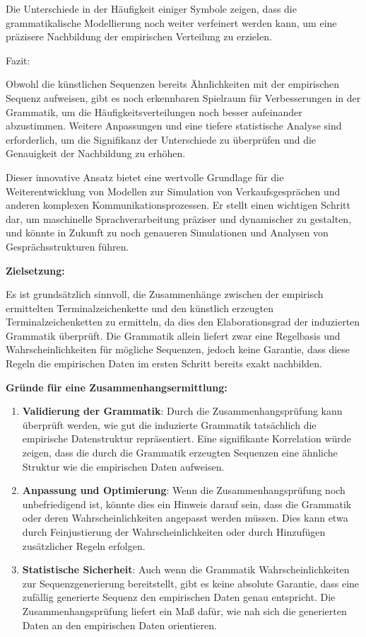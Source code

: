 \documentclass[
]{article}
\begin{document}
Die Unterschiede in der Häufigkeit einiger Symbole zeigen, dass die
grammatikalische Modellierung noch weiter verfeinert werden kann, um
eine präzisere Nachbildung der empirischen Verteilung zu erzielen.

Fazit:

Obwohl die künstlichen Sequenzen bereits Ähnlichkeiten mit der
empirischen Sequenz aufweisen, gibt es noch erkennbaren Spielraum für
Verbesserungen in der Grammatik, um die Häufigkeitsverteilungen noch
besser aufeinander abzustimmen. Weitere Anpassungen und eine tiefere
statistische Analyse sind erforderlich, um die Signifikanz der
Unterschiede zu überprüfen und die Genauigkeit der Nachbildung zu
erhöhen.

Dieser innovative Ansatz bietet eine wertvolle Grundlage für die
Weiterentwicklung von Modellen zur Simulation von Verkaufsgesprächen und
anderen komplexen Kommunikationsprozessen. Er stellt einen wichtigen
Schritt dar, um maschinelle Sprachverarbeitung präziser und dynamischer
zu gestalten, und könnte in Zukunft zu noch genaueren Simulationen und
Analysen von Gesprächsstrukturen führen.

\textbf{Zielsetzung:}

Es ist grundsätzlich sinnvoll, die Zusammenhänge zwischen der empirisch
ermittelten Terminalzeichenkette und den künstlich erzeugten
Terminalzeichenketten zu ermitteln, da dies den Elaborationsgrad der
induzierten Grammatik überprüft. Die Grammatik allein liefert zwar eine
Regelbasis und Wahrscheinlichkeiten für mögliche Sequenzen, jedoch keine
Garantie, dass diese Regeln die empirischen Daten im ersten Schritt
bereits exakt nachbilden.

\textbf{Gründe für eine Zusammenhangsermittlung:}

\begin{enumerate}
\def\labelenumi{\arabic{enumi}.}
\item
  \textbf{Validierung der Grammatik}: Durch die Zusammenhangsprüfung
  kann überprüft werden, wie gut die induzierte Grammatik tatsächlich
  die empirische Datenstruktur repräsentiert. Eine signifikante
  Korrelation würde zeigen, dass die durch die Grammatik erzeugten
  Sequenzen eine ähnliche Struktur wie die empirischen Daten aufweisen.
\item
  \textbf{Anpassung und Optimierung}: Wenn die Zusammenhangsprüfung noch
  unbefriedigend ist, könnte dies ein Hinweis darauf sein, dass die
  Grammatik oder deren Wahrscheinlichkeiten angepasst werden müssen.
  Dies kann etwa durch Feinjustierung der Wahrscheinlichkeiten oder
  durch Hinzufügen zusätzlicher Regeln erfolgen.
\item
  \textbf{Statistische Sicherheit}: Auch wenn die Grammatik
  Wahrscheinlichkeiten zur Sequenzgenerierung bereitstellt, gibt es
  keine absolute Garantie, dass eine zufällig generierte Sequenz den
  empirischen Daten genau entspricht. Die Zusammenhangsprüfung liefert
  ein Maß dafür, wie nah sich die generierten Daten an den empirischen
  Daten orientieren.
\end{enumerate}
\end{document}
